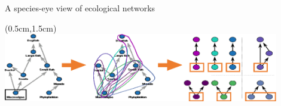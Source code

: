 \documentclass{beamer}
\begin{document}
  \begin{frame}{A species-eye view of ecological networks}


    \begin{textblock*}{12cm}(0.5cm,1.5cm)
      \includegraphics[width=12cm]{intro_figs/role_breakdown.eps}
      \end{textblock*} 

    \end{frame}
\end{document}
